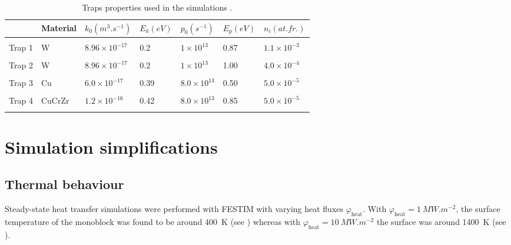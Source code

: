 \begin{table}
    \centering
    \begin{tabular}{L{1.5cm} L{1.5cm} R{1.7cm} R{1.1cm} R{1.6cm} R{1.1cm} R{1.9cm}}
         & Material & $k_0 (\si{m^3.s^{-1}})$ &  $E_k (\si{eV})$ & $p_0 (\si{s^{-1}})$ & $E_p (\si{eV})$ & $n_i (\si{at.fr.})$ \\
        \hline
        \\
        Trap 1 & W & $8.96 \times 10^{-17}$ & 0.2 & $1 \times 10^{13}$& 0.87 & $1.1 \times 10^{-3}$ \\
        \\
        Trap 2 & W & $8.96 \times 10^{-17}$ & 0.2 & $1 \times 10^{13}$& 1.00 & $4.0 \times 10^{-4}$ \\
        \\
        Trap 3 & Cu & $6.0 \times 10^{-17}$ & 0.39 & $8.0 \times 10^{13}$ & 0.50 &$5.0 \times 10^{-5}$\\
        \\
        Trap 4 & CuCrZr & $1.2\times 10^{-16}$ & 0.42 & $8.0 \times 10^{13}$ & 0.85 &$5.0 \times 10^{-5}$\\
        \\
    \end{tabular}
    \caption{Traps properties used in the simulations \cite{hodille_macroscopic_2015, dolan_assessment_1994}.}
\end{table}

\section{Simulation simplifications}

\subsection{Thermal behaviour}
Steady-state heat transfer simulations were performed with FESTIM with varying heat fluxes $\varphi_\mathrm{heat}$.
With $\varphi_\mathrm{heat} = \SI{1}{MW.m^{-2}}$, the surface temperature of the monoblock was found to be around \SI{400}{K} (see ) whereas with $\varphi_\mathrm{heat} = \SI{10}{MW.m^{-2}}$ the surface was around \SI{1400}{K} (see ).

